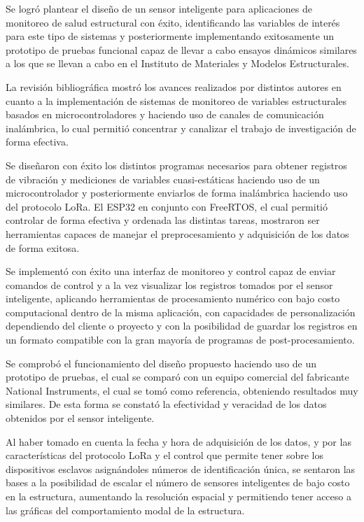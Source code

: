 Se logró plantear el diseño de un sensor inteligente para aplicaciones de monitoreo de salud estructural con éxito, identificando las variables de interés para este tipo de sistemas y posteriormente implementando exitosamente un prototipo de pruebas funcional capaz de llevar a cabo ensayos dinámicos similares a los que se llevan a cabo en el Instituto de Materiales y Modelos Estructurales.
	
	La revisión bibliográfica mostró los avances realizados por distintos autores en cuanto a la implementación de sistemas de monitoreo de variables estructurales basados en microcontroladores y haciendo uso de canales de comunicación inalámbrica, lo cual permitió concentrar y canalizar el trabajo de investigación de forma efectiva.
	
	
	Se diseñaron con éxito los distintos programas necesarios para obtener registros de vibración y mediciones de variables cuasi-estáticas haciendo uso de un microcontrolador y posteriormente enviarlos de forma inalámbrica haciendo uso del protocolo LoRa. El ESP32 en conjunto con FreeRTOS, el cual permitió controlar de forma efectiva y ordenada las distintas tareas, mostraron ser herramientas capaces de manejar el preprocesamiento y adquisición de los datos de forma exitosa.
	
	Se implementó con éxito una interfaz de monitoreo y control capaz de enviar comandos de control y a la vez visualizar los registros tomados por el sensor inteligente, aplicando herramientas de procesamiento numérico con bajo costo computacional dentro de la misma aplicación, con capacidades de personalización dependiendo del cliente o proyecto y con la posibilidad de guardar los registros en un formato compatible con la gran mayoría de programas de post-procesamiento.

	Se comprobó el funcionamiento del diseño propuesto haciendo uso de un prototipo de pruebas, el cual se comparó con un equipo comercial del fabricante National Instruments, el cual se tomó como referencia, obteniendo resultados muy similares. De esta forma se constató la efectividad y veracidad de los datos obtenidos por el sensor inteligente.
	
	Al haber tomado en cuenta la fecha y hora de adquisición de los datos, y por las características del protocolo LoRa y el control que permite tener sobre los dispositivos esclavos asignándoles números de identificación única, se sentaron las bases a la posibilidad de escalar el número de sensores inteligentes de bajo costo en la estructura, aumentando la resolución espacial y permitiendo tener acceso a las gráficas del comportamiento modal de la estructura.
	
